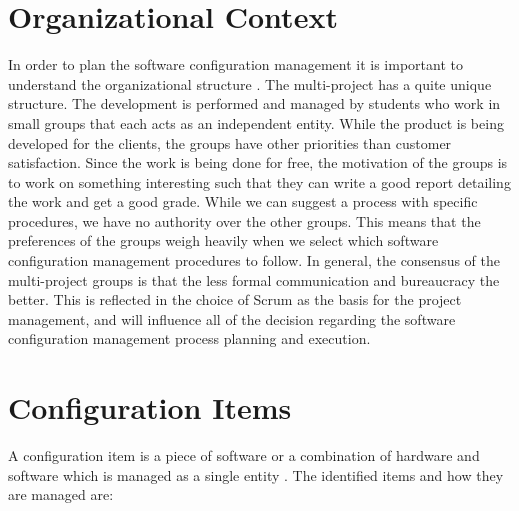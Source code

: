 \section{Organizational Context}\label{sec:SCM_orgcontext}
In order to plan the software configuration management it is important to understand the organizational structure \parencite[ch.6]{swebok}. The multi-project has a quite unique structure. The development is performed and managed by students who work in small groups that each acts as an independent entity. While the product is being developed for the clients, the groups have other priorities than customer satisfaction. Since the work is being done for free, the motivation of the groups is to work on something interesting such that they can write a good report detailing the work and get a good grade. While we can suggest a process with specific procedures, we have no authority over the other groups. This means that the  preferences of the groups weigh heavily when we select which software configuration management procedures to follow. In general, the consensus of the multi-project groups is that the less formal communication and bureaucracy the better. This is reflected in the choice of Scrum as the basis for the project management, and will influence all of the decision regarding the software configuration management process planning and execution.

\section{Configuration Items}\label{sec:SCM_configitems}
A configuration item is a piece of software or a combination of hardware and software which is managed as a single entity \parencite[ch.6]{swebok}. The identified items and how they are managed are:

